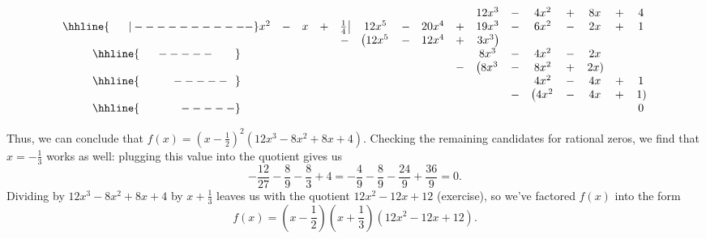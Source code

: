 {\begin{enumerate}
{

\setlength\arraycolsep{0.1pt}
\setlength\extrarowheight{2pt}

\[ \begin{array}{cccccccccccccccc}

& & & & & & & & &12x^3 & - & 4x^2 & + & 8x & + & 4  \\ \hhline{~~~~~|-----------}

x^2 & - & x & + & \frac{1}{4} \, \vline& 12x^5 & - & 20x^4 & + & 19x^3 & - & 6x^2 & - & 2x & + & 1 \\
    &   &   &   &  -& \left(12x^5 \right.& - & 12x^4 & + & \left. 3 x^3\right) & & &  &  &  &  \\ \hhline{~~~~~-----~~~~~~} 
    &   &   &   &   &                    &   &       &   & 8x^3 & - & 4x^2 & - & 2x \\ 
    &   &   &   &   &                    &   &       & - &\left(8x^3\right.& - & 8x^2 & + & \left.2x\right) & &  \\ \hhline{~~~~~~~~~-----~~} 
    &   &   &   &   &                    &   &       &   &                 &   & 4x^2 & - & 4x & + & 1\\
    &   &   &   &   &                    &   &       &   &                 & -  &\left( 4x^2\right. & - & 4x & + &\left. 1\right)\\ \hhline{~~~~~~~~~~~-----} 
        &   &   &   &   &                    &   &       &   &    &   &  &  &  &  & 0
 \end{array}\]
 
 \setlength\arraycolsep{5pt}
\setlength\extrarowheight{0pt}

Thus, we can conclude that $f(x) = \left(x-\frac{1}{2}\right)^2(12x^3-8x^2+8x+4)$. Checking the remaining candidates for rational zeros, we find that $x=-\frac{1}{3}$ works as well: plugging this value into the quotient gives us
\[
-\frac{12}{27}-\frac{8}{9}-\frac{8}{3}+4 = -\frac{4}{9}-\frac{8}{9}-\frac{24}{9}+\frac{36}{9} = 0.
\]
Dividing by $12x^3-8x^2+8x+4$ by $x+\frac{1}{3}$ leaves us with the quotient $12x^2-12x+12$ (exercise), so we've factored $f(x)$ into the form
\[
f(x) = \left(x-\frac{1}{2}\right)\left(x+\frac{1}{3}\right)(12x^2-12x+12).
\]
}


\end{enumerate}}

